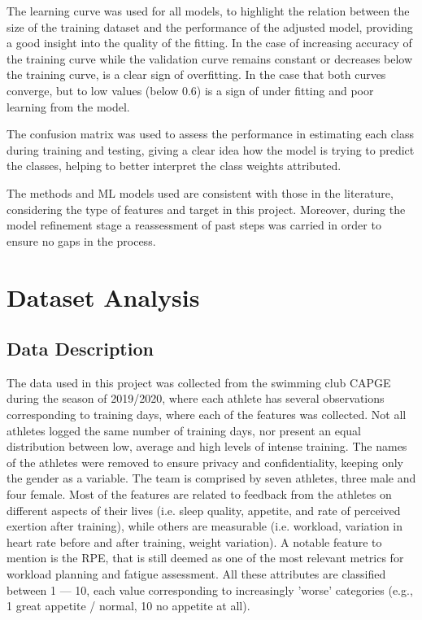 \documentclass[conference]{IEEEtran}
\begin{document}
The learning curve was used for all models, to highlight the relation between the size of the training dataset and the performance of the adjusted model, providing a good insight into the quality of the fitting. In the case of increasing accuracy of the training curve while the validation curve remains constant or decreases below the training curve, is a clear sign of overfitting. In the case that both curves converge, but to low values (below 0.6) is a sign of under fitting and poor learning from the model.

The confusion matrix was used to assess the performance in estimating each class during training and testing, giving a clear idea how the model is trying to predict the classes, helping to better interpret the class weights attributed.

The methods and ML models used are consistent with those in the literature, considering the type of features and target in this project. Moreover, during the model refinement stage a reassessment of past steps was carried in order to ensure no gaps in the process. 

\section{Dataset Analysis}

\subsection{Data Description}

The data used in this project was collected from the swimming club CAPGE during the season of 2019/2020, where each athlete has several observations corresponding to training days, where each of the features was collected. Not all athletes logged the same number of training days, nor present an equal distribution between low, average and high levels of intense training. The names of the athletes were removed to ensure privacy and confidentiality, keeping only the gender as a variable. The team is comprised by seven athletes, three male and four female. Most of the features are related to feedback from the athletes on different aspects of their lives (i.e. sleep quality, appetite, and rate of perceived exertion after training), while others are measurable (i.e. workload, variation in heart rate before and after training, weight variation). A notable feature to mention is the RPE, that is still deemed as one of the most relevant metrics for workload planning and fatigue assessment. All these attributes are classified between 1 — 10, each value corresponding to increasingly 'worse' categories (e.g., 1 great appetite / normal, 10 no appetite at all).
\end{document}
